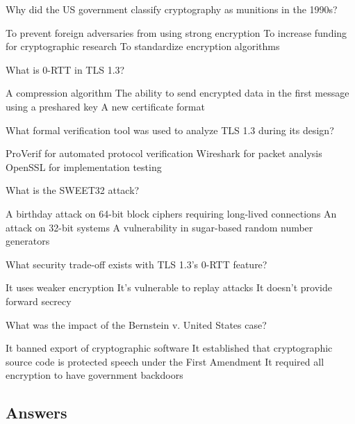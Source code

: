 \documentclass[10pt,a4paper,american]{exam}
\begin{document}
\begin{questions}
	\question Why did the US government classify cryptography as munitions in the 1990s?
	\begin{randomizechoices}
		\CorrectChoice To prevent foreign adversaries from using strong encryption
		\choice To increase funding for cryptographic research
		\choice To standardize encryption algorithms
	\end{randomizechoices}

	\question What is 0-RTT in TLS 1.3?
	\begin{randomizechoices}
		\choice A compression algorithm
		\CorrectChoice The ability to send encrypted data in the first message using a preshared key
		\choice A new certificate format
	\end{randomizechoices}

	\question What formal verification tool was used to analyze TLS 1.3 during its design?
	\begin{randomizechoices}
		\CorrectChoice ProVerif for automated protocol verification
		\choice Wireshark for packet analysis
		\choice OpenSSL for implementation testing
	\end{randomizechoices}

	\question What is the SWEET32 attack?
	\begin{randomizechoices}
		\CorrectChoice A birthday attack on 64-bit block ciphers requiring long-lived connections
		\choice An attack on 32-bit systems
		\choice A vulnerability in sugar-based random number generators
	\end{randomizechoices}

	\question What security trade-off exists with TLS 1.3's 0-RTT feature?
	\begin{randomizechoices}
		\choice It uses weaker encryption
		\CorrectChoice It's vulnerable to replay attacks
		\choice It doesn't provide forward secrecy
	\end{randomizechoices}

	\question What was the impact of the Bernstein v. United States case?
	\begin{randomizechoices}
		\choice It banned export of cryptographic software
		\CorrectChoice It established that cryptographic source code is protected speech under the First Amendment
		\choice It required all encryption to have government backdoors
	\end{randomizechoices}

\end{questions}

\clearpage

\subsection*{Answers}
\printkeytable
\end{document}
